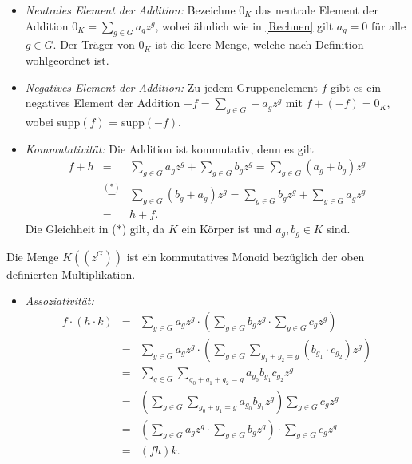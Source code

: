 {\begin{itemize}
\item \textit{Neutrales Element der Addition:} Bezeichne $0_K$ das neutrale Element der Addition $0_K = \sum_{g \in G}^{} a_g z^g$, wobei ähnlich wie in \ref{Rechnen} gilt $a_g = 0$ für alle $g \in G$. Der Träger von $0_K$ ist die leere Menge, welche nach Definition wohlgeordnet ist.
\item \textit{Negatives Element der Addition:} Zu jedem Gruppenelement $f$ gibt es ein negatives Element der Addition $-f = \sum_{g \in G}^{} -a_g z^g$ mit $f+ \left(-f\right) = 0_K$, wobei supp$(f)$ = supp$(-f)$.
\item \textit{Kommutativität:} 
Die Addition ist kommutativ, denn es gilt 
\begin{eqnarray*}
f+ h &=& \sum_{g \in G}^{} a_gz^g + \sum_{g \in G}^{} b_gz^g 
= \sum_{g \in G}^{} \left(a_g  + b_g\right) z^g \\
&\stackrel{\mathrm{(*)}}=& \sum_{g \in G}^{} \left(b_g  + a_g\right) z^g 
= \sum_{g \in G}^{} b_gz^g +  \sum_{g \in G}^{} a_gz^g \\
&=& h + f.
\end{eqnarray*}
Die Gleichheit in ($*$) gilt, da $K$ ein Körper ist und $a_g, b_g \in K$ sind.  
\end{itemize}
%
%
%
%
%
%
Die Menge $K\left(\left(z^{G}\right)\right)$ ist ein kommutatives Monoid bezüglich der oben definierten Multiplikation.
\begin{itemize}
\item \textit{Assoziativität:}
\begin{eqnarray*}
 f\cdot \left(h \cdot k\right) &= & \sum_{g \in G}^{} a_g z^g \cdot \left( \sum_{g \in G}^{} b_g z^g \cdot \sum_{g \in G}^{}c_g z^g \right) \\
&=& \sum_{g \in G}^{} a_g z^g \cdot \left( \sum_{g \in G}^{}\sum_{g_1 + g_2 = g}^{} \left(b_{g_1} \cdot c_{g_2}\right) z^g \right)\\
&=&  \sum_{g \in G}^{}\sum_{g_0 + g_1 + g_2  = g}^{} a_{g_0} b_{g_1} c_{g_2} z^g \\
& =& \left(\sum_{g \in G}^{}\sum_{g_0 + g_1 = g}^{} a_{g_0} b_{g_1}z^g\right) \sum_{g \in G}^{}c_g z^g   \\
&= &  \left(\sum_{g \in G}^{} a_g z^g \cdot \sum_{g \in G}^{} b_g z^g \right)\cdot \sum_{g \in G}^{}c_g z^g \\
&=& \left(fh\right) k .
\end{eqnarray*}
%
%
%
%
%

\end{itemize}}
